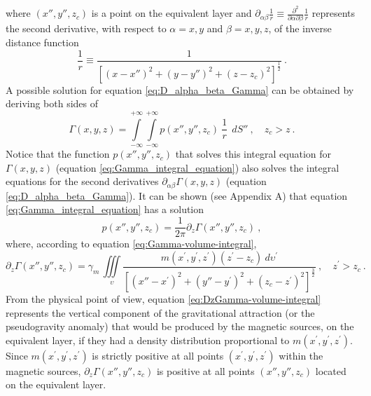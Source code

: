 where $(x'', y'', z_{c})$ is a point on the equivalent layer and 
$\partial_{\alpha\beta} \frac{1}{r} \equiv 
\frac{\partial^{2}}{\partial \alpha \partial \beta} \frac{1}{r}$ 
represents the second derivative,
with respect to $\alpha = x, y$ and $\beta = x, y, z$, of the inverse distance 
function
\begin{equation}
\frac{1}{r} \equiv 
\frac{1}{\left[ (x-x'')^2 + (y-y'')^2 + (z-z_{c})^2 \right]^{\frac{1}{2}}} \: .
\label{eq:inverse-distance}
\end{equation}
A possible solution for equation \ref{eq:D_alpha_beta_Gamma} can be obtained 
by deriving both sides of
\begin{equation}
\Gamma(x, y, z) = 
\int\limits_{-\infty}^{+\infty}\int\limits_{-\infty}^{+\infty}
p(x'', y'', z_{c}) \: \frac{1}{r} \:\: dS'' \: ,
\quad z_{c} > z \: .
\label{eq:Gamma_integral_equation}
\end{equation}
Notice that the function $p(x'', y'', z_{c})$ that solves this 
integral equation for $\Gamma(x, y, z)$ (equation \ref{eq:Gamma_integral_equation})
also solves the integral equations for the second derivatives 
$\partial_{\alpha\beta} \Gamma(x, y, z)$ (equation \ref{eq:D_alpha_beta_Gamma}). 
It can be shown (see Appendix A) that equation \ref{eq:Gamma_integral_equation} 
has a solution
\begin{equation}
p(x'', y'', z_{c}) = \frac{1}{2\pi} \partial_{z} \Gamma(x'', y'', z_{c}) \: ,
\label{eq:positivity_prop}
\end{equation}
where, according to equation \ref{eq:Gamma-volume-integral},
\begin{equation}
\partial_{z} \Gamma(x'', y'', z_{c}) = \gamma_{m} \, \iiint\limits_{\upsilon} 
\frac{m(x^{\prime}, y^{\prime}, z^{\prime}) (z^{\prime} - z_{c}) \: 
	d\upsilon^{\prime}}
{\left[ (x''-x^{\prime})^2 + (y''-y^{\prime})^2 + (z_{c}-z^{\prime})^2 \right]^{\frac{3}{2}}} \: , \quad z^{\prime} > z_{c} \: .
\label{eq:DzGamma-volume-integral}
\end{equation}
From the physical point of view, equation \ref{eq:DzGamma-volume-integral} 
represents the vertical component of the gravitational attraction 
(or the pseudogravity anomaly) that would be produced by the magnetic sources,
on the equivalent layer, if they had a density distribution proportional to 
$m(x^{\prime}, y^{\prime}, z^{\prime})$.
Since $m(x^{\prime}, y^{\prime}, z^{\prime})$ is strictly positive
at all points $(x^{\prime}, y^{\prime}, z^{\prime})$ within the magnetic sources,
$\partial_{z} \Gamma(x'', y'', z_{c})$ is positive at all points 
$(x'', y'', z_{c})$ located on the equivalent layer.

